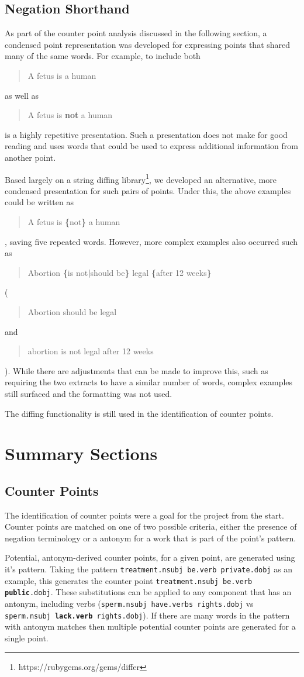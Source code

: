     \tocless\subsection{Negation Shorthand}
      As part of the counter point analysis discussed in the following section, a condensed point representation was developed for expressing points that shared many of the same words. For example, to include both \blockquote{A fetus is a human} as well as \blockquote{A fetus is \textbf{not} a human} is a highly repetitive presentation. Such a presentation does not make for good reading and uses words that could be used to express additional information from another point.

      Based largely on a string diffing library\footnote{https://rubygems.org/gems/differ}, we developed an alternative, more condensed presentation for such pairs of points. Under this, the above examples could be written as \blockquote{A fetus is \textbf{\{}not\textbf{\}} a human}, saving five repeated words. However, more complex examples also occurred such as \blockquote{Abortion \textbf{\{}is not\textbf{|}should be\textbf{\}} legal \textbf{\{}after 12 weeks\textbf{\}}} (\blockquote{Abortion should be legal} and \blockquote{abortion is not legal after 12 weeks}). While there are adjustments that can be made to improve this, such as requiring the two extracts to have a similar number of words, complex examples still surfaced and the formatting was not used.

      The diffing functionality is still used in the identification of counter points.

  \section{Summary Sections}
    \subsection{Counter Points}
      The identification of counter points were a goal for the project from the start. Counter points are matched on one of two possible criteria, either the presence of negation terminology or a antonym for a work that is part of the point's pattern.

      Potential, antonym-derived counter points, for a given point, are generated using it's pattern. Taking the pattern \texttt{treatment.nsubj be.verb private.dobj} as an example, this generates the counter point \texttt{treatment.nsubj be.verb \textbf{public}.dobj}. These substitutions can be applied to any component that has an antonym, including verbs (\texttt{sperm.nsubj have.verbs rights.dobj} vs \texttt{sperm.nsubj \textbf{lack.verb} rights.dobj}). If there are many words in the pattern with antonym matches then multiple potential counter points are generated for a single point.


